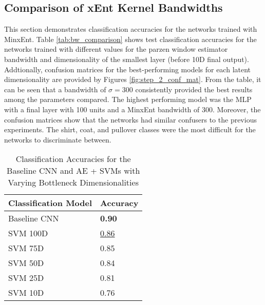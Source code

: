 \documentclass[conference]{IEEEtran}
\begin{document}
 
\subsection{Comparison of xEnt Kernel Bandwidths} \label{bw_comparison}
This section demonstrates classification accuracies for the networks trained with MinxEnt.  Table \ref{tab:bw_comparison} shows test classification accuracies for the networks trained with different values for the parzen window estimator bandwidth and dimensionality of the smallest layer (before 10D final output).  Addtionally, confusion matrices for the best-performing models for each latent dimensionality are provided by Figures \ref{fig:step_2_conf_mat}. From the table, it can be seen that a bandwidth of $\sigma=300$ consistently provided the best results among the parameters compared. The highest performing model was the MLP with a final layer with  100 units and a MinxEnt bandwidth of 300.  Moreover, the confusion matrices show that the networks had similar confusers to the previous experiments.  The shirt, coat, and pullover classes were the most difficult for the networks to discriminate between.

 \begin{table}[h]
	\caption{Classification Accuracies for the Baseline CNN and AE + SVMs with Varying Bottleneck Dimensionalities}
	\label{tab:step1comparison}
	\normalsize
	\begin{tabularx}{\columnwidth}{ |X|X| } 
		\hline
		\centering \textbf{Classification Model}  & \textbf{Accuracy} \\
		\hline
		\centering Baseline CNN & \textbf{0.90} \\
		\hline
		\centering SVM 100D & \underline{0.86} \\
		\hline
		\centering SVM 75D & 0.85 \\
		\hline
		\centering SVM 50D & 0.84 \\
		\hline
		\centering SVM 25D & 0.81 \\
		\hline
		\centering SVM 10D & 0.76 \\
		\hline
	\end{tabularx}
\end{table} 
\end{document}
